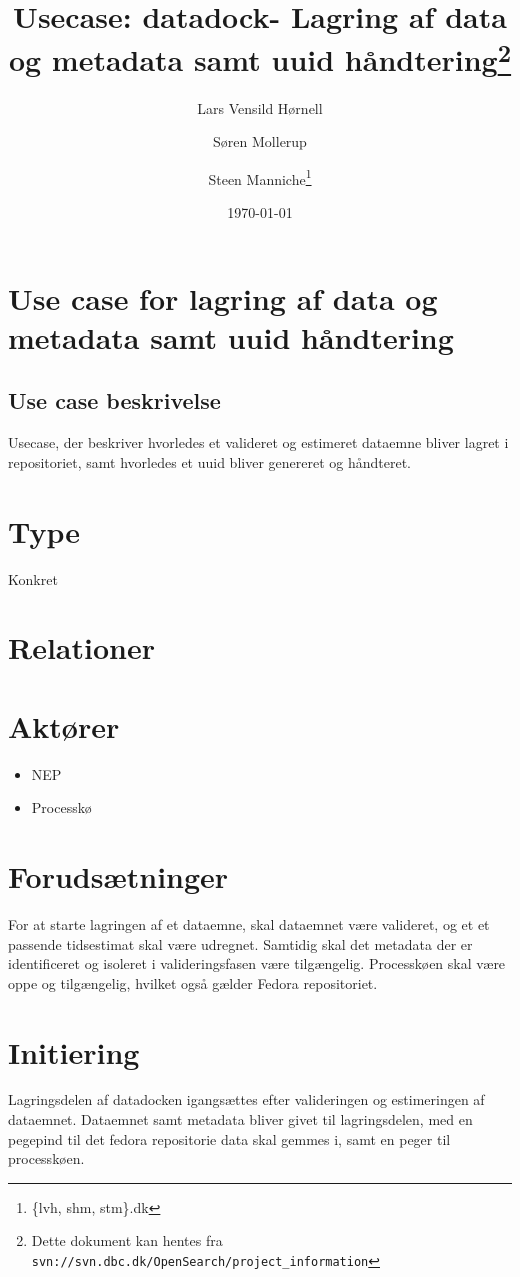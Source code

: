 \documentclass{article}
\author{Lars Vensild Hørnell \and Søren Mollerup \and Steen Manniche\thanks{\{lvh, shm, stm\}\@dbc.dk}}
\date{\today}
\title{Usecase: datadock- Lagring af data og metadata samt uuid håndtering\thanks{Dette dokument kan hentes fra \texttt{svn://svn.dbc.dk/OpenSearch/project\_information}}}
\begin{document}
\maketitle

\newpage

\tableofcontents

\section{Use case for lagring af data og metadata samt uuid håndtering}

\subsection{Use case beskrivelse}
Usecase, der beskriver hvorledes et valideret og estimeret dataemne
bliver lagret i repositoriet, samt hvorledes et uuid bliver genereret og håndteret.

\section{Type}
Konkret

\section{Relationer}

\section{Aktører}
\begin{itemize}
\item NEP
\item Processkø
\end{itemize}

\section{Forudsætninger} For at starte lagringen af et dataemne, skal
dataemnet være valideret, og et et passende tidsestimat skal være
udregnet. Samtidig skal det metadata der er identificeret og isoleret
i valideringsfasen være tilgængelig.
Processkøen skal være oppe og
tilgængelig, hvilket også gælder Fedora repositoriet.

\section{Initiering} Lagringsdelen af datadocken igangsættes efter
valideringen og estimeringen af dataemnet. Dataemnet samt metadata
bliver givet til lagringsdelen, med en pegepind til det fedora
repositorie data skal gemmes i, samt en peger til processkøen.
\end{document}
